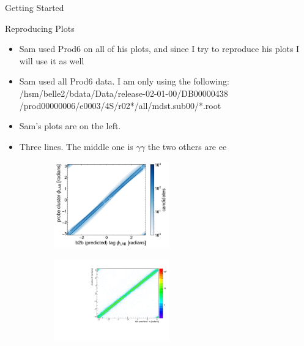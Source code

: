 \documentclass[10pt]{beamer}
\begin{document}
{\begin{frame}{Getting Started}
\begin{itemize}
\end{itemize}	
\end{frame}

\begin{frame}{Reproducing Plots}
	
	\begin{itemize}
		\item Sam used Prod6 on all of his plots, and since I try to reproduce his plots I will use it as well
		\item Sam used all Prod6 data. I am only using the following: /hsm/belle2/bdata/Data/release-02-01-00/DB00000438 /prod00000006/e0003/4S/r02*/all/mdst.sub00/*.root
		\item Sam's plots are on the left.	
		\item Three lines. The middle one is $\gamma \gamma$ the two others are $\textrm{ee}$
\end{itemize}
	
	
	\begin{figure}
		\centering
		\begin{subfigure}{.5\textwidth}
			\centering
			\includegraphics[width=5cm]{Plots/prodRecSam.jpeg}
			
			\label{fig:sub1}
		\end{subfigure}%
		\begin{subfigure}{.5\textwidth}
			\centering
			\includegraphics[width=5cm]{Plots/clusterb2b}
			
			\label{fig:sub2}
		\end{subfigure}
				
		\label{fig:test}
	\end{figure}
	
	
\end{frame}


}
\end{document}
